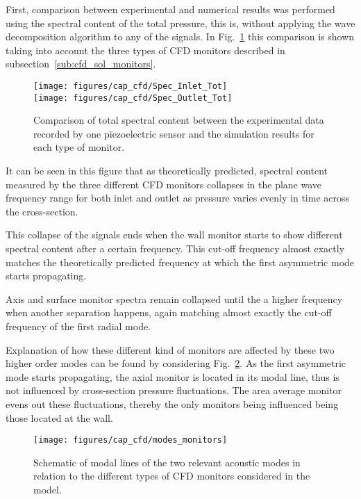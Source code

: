 First, comparison between experimental and numerical results was performed using the spectral content of the total pressure, this is, without applying the wave decomposition algorithm to any of the signals. In Fig.~\ref{fig:cfd_Spec_Inlet_Tot} this comparison is shown taking into account the three types of CFD monitors described in subsection~\ref{sub:cfd_sol_monitors}.

\begin{figure}[htb!]
\centering
\texttt{[image: figures/cap\_cfd/Spec\_Inlet\_Tot]}\\[5mm]
\texttt{[image: figures/cap\_cfd/Spec\_Outlet\_Tot]}
\caption{Comparison of total spectral content between the experimental data recorded by one piezoelectric sensor and the simulation results for each type of monitor.}
\label{fig:cfd_Spec_Inlet_Tot}
\end{figure}

It can be seen in this figure that as theoretically predicted,  spectral content measured by the three different CFD monitors collapses in the plane wave frequency range for both inlet and outlet as pressure varies evenly in time across the cross-section.

This collapse of the signals ends when the wall monitor starts to show different spectral content after a certain frequency. This cut-off frequency almost exactly matches the theoretically predicted frequency at which the first asymmetric mode starts propagating.

Axis and surface monitor spectra remain collapsed until the a higher frequency when another separation happens, again matching almost exactly the cut-off frequency of the first radial mode.

Explanation of how these different kind of monitors are affected by these two higher order modes can be found by considering Fig.~\ref{fig:cfd_modes_monitors}. As the first asymmetric mode starts propagating, the axial monitor is located in its modal line, thus is not influenced by cross-section pressure fluctuations. The area average monitor evens out these fluctuations, thereby the only monitors being influenced being those located at the wall.

\begin{figure}[htb!]
\centering
\texttt{[image: figures/cap\_cfd/modes\_monitors]}
\caption{Schematic of modal lines of the two relevant acoustic modes in relation to the different types of CFD monitors considered in the model.}
\label{fig:cfd_modes_monitors}
\end{figure}

